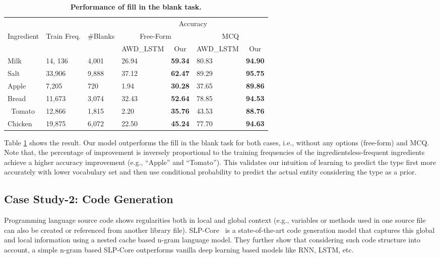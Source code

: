 \documentclass[11pt,a4paper]{article}
\begin{document}
\setlength{\tabcolsep}{2pt}
\begin{table}[h]
\scriptsize
\centering
 \begin{tabular}{l| l| l|l  c|l c} 
 \toprule
   &  &   & \multicolumn{4}{c}{Accuracy}\\
 Ingredient & Train Freq. & \#Blanks  & \multicolumn{2}{c}{Free-Form} & \multicolumn{2}{|c}{MCQ}\\
 &  & & AWD\_LSTM & Our  & AWD\_LSTM & Our\\ 
 \midrule
  Milk  &  14, 136 &4,001&    26.94   &  \textbf{59.34} &  80.83  & \textbf{94.90 }\\
    Salt &  33,906& 9,888&   37.12 & \textbf{62.47 }&89.29 &\textbf{95.75} \\
 Apple & 7,205 & 720  & 1.94    &  \textbf{30.28} &  37.65 &\textbf{89.86} \\
 Bread &11,673 & 3,074 &  32.43  &  \textbf{52.64 }& 78.85 &\textbf{94.53 }\\\
 Tomato &12,866& 1,815&  2.20    &\textbf{35.76 }& 43.53  &\textbf{88.76} \\
 Chicken & 19,875& 6,072 & 22.50  &\textbf{45.24 } &  77.70  &\textbf{94.63} \\
 \bottomrule
 \end{tabular}
 \caption{\textbf{\small Performance of fill in the blank task.}}
 \label{table:case-rcp}
\end{table}

Table \ref{table:case-rcp} shows the result. Our model outperforms the fill in the blank task for both cases, i.e.,  without any options (free-form) and MCQ. Note that, the percentage of improvement is inversely proportional to the training frequencies of the ingredients\textemdash less-frequent ingredients achieve a higher accuracy improvement (e.g., ``Apple'' and ``Tomato''). This validates our intuition of learning to predict the type first more accurately with lower vocabulary set and then use conditional probability to predict the actual entity considering the type as a prior. 


\subsection{Case Study-2: Code Generation} 

Programming language source code shows regularities both in local and global context (e.g., variables or methods used in one source file can also be created or referenced from another library file). SLP-Core~\cite{deep_net_for_source_code} is a state-of-the-art code generation model that captures this global and local information using a nested cache based n-gram language model. They further show that considering such code structure into account, a simple n-gram based SLP-Core outperforms vanilla deep learning based models like RNN, LSTM, etc. 
\end{document}
